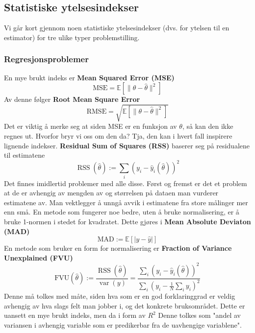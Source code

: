 \subsection{Statistiske ytelsesindekser}
Vi går kort gjennom noen statistiske ytelsesindekser (dvs. for ytelsen til en estimator) for tre ulike typer problemstilling.

\subsubsection{Regresjonsproblemer}
En mye brukt indeks er \textbf{Mean Squared Error (MSE)}
\begin{equation}
\textrm{MSE} = \mathbb{E}\left[\|\theta-\widehat{\theta}\|^{2}\right]
\end{equation}
Av denne følger \textbf{Root Mean Square Error}
\begin{equation}
\textrm{RMSE} = \sqrt{\mathbb{E}\left[\|\theta-\widehat{\theta}\|^{2}\right]}
\end{equation}
Det er viktig å merke seg at siden MSE er en funksjon av $\theta$, så kan den ikke regnes ut. Hvorfor bryr vi oss om den da? Tja, den kan i hvert fall inspirere lignende indekser. \textbf{Residual Sum of Squares (RSS)} baserer seg på residualene til estimatene
\begin{equation}
\operatorname{RSS}(\widehat{\theta}):=\sum_{i}\left(y_{i}-\widehat{y}_{i}(\widehat{\theta})\right)^{2}
\end{equation}
Det finnes imidlertid problemer med alle disse. Først og fremst er det et problem at de er avhengig av mengden av og størrelsen på dataen man vurderer estimatene av. Man vektlegger å unngå avvik i estimatene fra store målinger mer enn små. En metode som fungerer noe bedre, uten å bruke normalisering, er å bruke 1-normen i stedet for kvadratet. Dette gjøres i \textbf{Mean Absolute Deviaton (MAD)}
\begin{equation}
\mathrm{MAD}:=\mathbb{E}[|y-\widehat{y}|]
\end{equation}
En metode som bruker en form for normalisering er \textbf{Fraction of Variance Unexplained (FVU)}
\begin{equation}
\mathrm{FVU}(\widehat{\theta}):=\frac{\operatorname{RSS}(\widehat{\theta})}{\operatorname{var}(y)}=\frac{\sum_{i}\left(y_{i}-\widehat{y}_{i}(\widehat{\theta})\right)^{2}}{\sum_{i}\left(y_{i}-\frac{1}{N} \sum_{i} y_{i}\right)^{2}}
\end{equation}
Denne må tolkes med måte, siden hva som er en god forklaringgrad er veldig avhengig av hva slags felt man jobber i, og det konkrete bruksområdet. Dette er uansett en mye brukt indeks, men da i form av $R^{2}$
Denne tolkes som "andel av variansen i avhengig variable som er predikerbar fra de uavhengige variablene".

